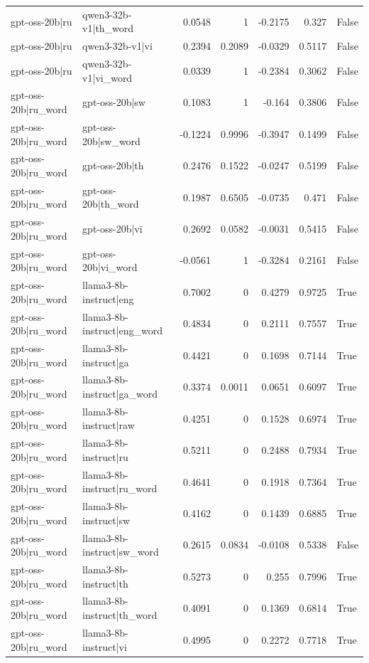 \begin{table}
\begin{tabular}{l l r r r r l}
gpt-oss-20b|ru & qwen3-32b-v1|th_word & 0.0548 & 1 & -0.2175 & 0.327 & False \\
gpt-oss-20b|ru & qwen3-32b-v1|vi & 0.2394 & 0.2089 & -0.0329 & 0.5117 & False \\
gpt-oss-20b|ru & qwen3-32b-v1|vi_word & 0.0339 & 1 & -0.2384 & 0.3062 & False \\
gpt-oss-20b|ru_word & gpt-oss-20b|sw & 0.1083 & 1 & -0.164 & 0.3806 & False \\
gpt-oss-20b|ru_word & gpt-oss-20b|sw_word & -0.1224 & 0.9996 & -0.3947 & 0.1499 & False \\
gpt-oss-20b|ru_word & gpt-oss-20b|th & 0.2476 & 0.1522 & -0.0247 & 0.5199 & False \\
gpt-oss-20b|ru_word & gpt-oss-20b|th_word & 0.1987 & 0.6505 & -0.0735 & 0.471 & False \\
gpt-oss-20b|ru_word & gpt-oss-20b|vi & 0.2692 & 0.0582 & -0.0031 & 0.5415 & False \\
gpt-oss-20b|ru_word & gpt-oss-20b|vi_word & -0.0561 & 1 & -0.3284 & 0.2161 & False \\
gpt-oss-20b|ru_word & llama3-8b-instruct|eng & 0.7002 & 0 & 0.4279 & 0.9725 & True \\
gpt-oss-20b|ru_word & llama3-8b-instruct|eng_word & 0.4834 & 0 & 0.2111 & 0.7557 & True \\
gpt-oss-20b|ru_word & llama3-8b-instruct|ga & 0.4421 & 0 & 0.1698 & 0.7144 & True \\
gpt-oss-20b|ru_word & llama3-8b-instruct|ga_word & 0.3374 & 0.0011 & 0.0651 & 0.6097 & True \\
gpt-oss-20b|ru_word & llama3-8b-instruct|raw & 0.4251 & 0 & 0.1528 & 0.6974 & True \\
gpt-oss-20b|ru_word & llama3-8b-instruct|ru & 0.5211 & 0 & 0.2488 & 0.7934 & True \\
gpt-oss-20b|ru_word & llama3-8b-instruct|ru_word & 0.4641 & 0 & 0.1918 & 0.7364 & True \\
gpt-oss-20b|ru_word & llama3-8b-instruct|sw & 0.4162 & 0 & 0.1439 & 0.6885 & True \\
gpt-oss-20b|ru_word & llama3-8b-instruct|sw_word & 0.2615 & 0.0834 & -0.0108 & 0.5338 & False \\
gpt-oss-20b|ru_word & llama3-8b-instruct|th & 0.5273 & 0 & 0.255 & 0.7996 & True \\
gpt-oss-20b|ru_word & llama3-8b-instruct|th_word & 0.4091 & 0 & 0.1369 & 0.6814 & True \\
gpt-oss-20b|ru_word & llama3-8b-instruct|vi & 0.4995 & 0 & 0.2272 & 0.7718 & True \\

\end{tabular}
\end{table}

